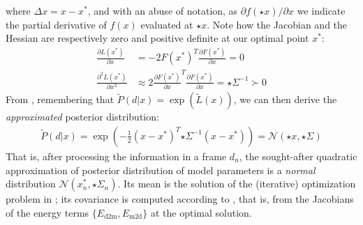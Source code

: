 %
where $\Delta x=x - x^*$, and with an abuse of notation, as $\partial f(\star{x})/\partial x$ we indicate the partial derivative of $f(x)$ evaluated at $\star{x}$. Note how the Jacobian and the Hessian are respectively zero and positive definite at our optimal point $x^*$:
%
\begin{align}
\tfrac{\partial L(x^*)}{\partial x} &= - 2 F(x^*)^T 
\tfrac{\partial F(x^*)}{\partial x} = 0 
\label{eq:taylor-jacobian}
\\
\tfrac{\partial^2 L(x^*)}{\partial x^2} 
& \approx 2 \tfrac{\partial F(x^*)}{\partial x}^T \tfrac{\partial F(x^*)}{\partial x}
= {\star{\Sigma}}^{-1} \succ 0
\label{eq:taylor-hessian}
\end{align}
% 
From , remembering that $\tilde P(d|x) = \exp (\tilde{L}(x))$, we can then derive the \emph{approximated} posterior distribution:
%
\begin{align}
\tilde{P}(d|x) = \exp\left(- \tfrac{1}{2}(x - x^*)^T {\star{\Sigma}}^{-1}  (x - x^*) \right) = \mathcal{N}\left(\star{x}, \star{\Sigma} \right)
\end{align}
%
That is, after processing the information in a frame $d_n$, the sought-after quadratic approximation of posterior distribution of model parameters is a \emph{normal} distribution $\mathcal{N}\left(x_n^*, \star\Sigma_n \right)$.
Its mean is the solution of the (iterative) optimization problem in ; its covariance is computed according to , that is, from the Jacobians of the energy terms $\{E_{\text{d2m}}, E_{\text{m2d}}\}$ at the optimal solution.

